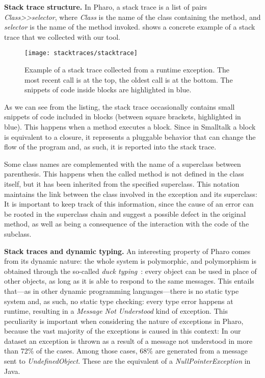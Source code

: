 {\bf Stack trace structure.} In Pharo, a stack trace is a list of pairs \textit{Class{>}{>}selector}, where \textit{Class} is the name of the class containing the method, and \textit{selector} is the name of the method invoked.  shows a concrete example of a stack trace that we collected with our tool.

\begin{figure}[ht]
\begin{center}
  \texttt{[image: stacktraces/stacktrace]}
  \caption{Example of a stack trace collected from a runtime exception. The most recent call is at the top, the oldest call is at the bottom. The snippets of code inside blocks are highlighted in blue.}
  \label{fig:stacktrace}
\end{center}
\end{figure}

As we can see from the listing, the stack trace occasionally contains small snippets of code included in blocks (between square brackets, highlighted in blue). This happens when a method executes a block. Since in Smalltalk a block is equivalent to a closure, it represents a pluggable behavior that can change the flow of the program and, as such, it is reported into the stack trace. 

Some class names are complemented with the name of a superclass between parenthesis. This happens when the called method is not defined in the class itself, but it has been inherited from the specified superclass. This notation maintains the link between the class involved in the exception and its superclass: It is important to keep track of this information, since the cause of an error can be rooted in the superclass chain and suggest a possible defect in the original method, as well as being a consequence of the interaction with the code of the subclass.

{\bf Stack traces and dynamic typing.} An interesting property of Pharo comes from its dynamic nature: the whole system is polymorphic, and polymorphism is obtained through the so-called \emph{duck typing}~\cite{Chugh2012}: every object can be used in place of other objects, as long as it is able to respond to the same messages. This entails that---as in other dynamic programming languages---there is no static type system and, as such, no static type checking: every type error happens at runtime, resulting in a \emph{Message Not Understood} kind of exception. This peculiarity is important when considering the nature of exceptions in Pharo, because the vast majority of the exceptions is caused in this context: In our dataset an exception is thrown as a result of a message not understood in more than 72\% of the cases. Among those cases, 68\% are generated from a message sent to \emph{UndefinedObject}. These are the equivalent of a \emph{NullPointerException} in Java.

